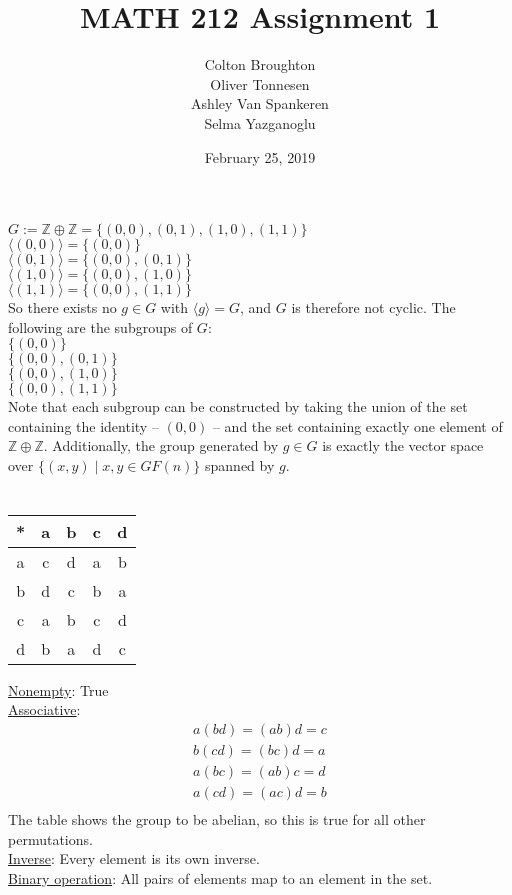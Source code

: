 \documentclass{article}
\title{MATH 212 Assignment 1}
\author{Colton Broughton\\
		Oliver Tonnesen\\
		Ashley Van Spankeren\\
		Selma Yazganoglu}
\date{February 25, 2019}
\begin{document}
\maketitle
\renewcommand{\thesubsection}{\thesection.\alph{subsection}}
\section{} %
$G:=\mathbb{Z}\oplus\mathbb{Z}=\{(0,0),(0,1),(1,0),(1,1)\}$\\
$\langle(0,0)\rangle=\{(0,0)\}$\\
$\langle(0,1)\rangle=\{(0,0),(0,1)\}$\\
$\langle(1,0)\rangle=\{(0,0),(1,0)\}$\\
$\langle(1,1)\rangle=\{(0,0),(1,1)\}$\\
So there exists no $g\in G$ with $\langle g\rangle=G$, and $G$ is therefore not
cyclic. The following are the subgroups of $G$:\\
$\{(0,0)\}$\\
$\{(0,0),(0,1)\}$\\
$\{(0,0),(1,0)\}$\\
$\{(0,0),(1,1)\}$\\
\newline
Note that each subgroup can be constructed by taking the union of the set
containing the identity -- $(0,0)$ -- and the set containing exactly one
element of $\mathbb{Z}\oplus\mathbb{Z}$. Additionally, the group generated by
$g\in G$ is exactly the vector space over $\{(x,y)\mid x,y\in GF(n)\}$ spanned
by $g$.
\section{} %
\begin{tabular}{c|cccc}
	* & a & b & c & d \\
	\hline
	a & c & d & a & b \\
	b & d & c & b & a \\
	c & a & b & c & d \\
	d & b & a & d & c \\
\end{tabular}
\newline
\newline
\newline
\underline{Nonempty}: True\\
\newline
\underline{Associative}:
\begin{align*}
	a(bd)=(ab)d=c\\
	b(cd)=(bc)d=a\\
	a(bc)=(ab)c=d\\
	a(cd)=(ac)d=b\\
\end{align*}
The table shows the group to be abelian, so this is true for all other
permutations.\\
\newline
\underline{Inverse}: Every element is its own inverse.\\
\newline
\underline{Binary operation}: All pairs of elements map to an element in
the set.\\
\end{document}
